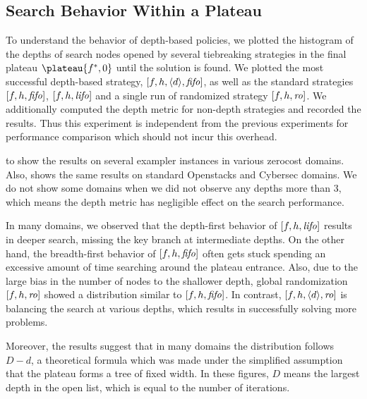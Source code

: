 \subsection{Search Behavior Within a Plateau}

To understand the behavior of depth-based policies, we plotted the
histogram of the depths of search nodes opened by several tiebreaking
strategies in the final plateau $\plateau{f^*,0}$ until the solution is
found.  We plotted the most successful depth-based strategy,
$[f,h,{\left<d\right>},{\text{\textit{fifo}}}]$, as well as the standard strategies $[f,h,{\text{\textit{fifo}}}]$,
$[f,h,{\text{\textit{lifo}}}]$ and a single run of randomized strategy $[f,h,{\text{\textit{ro}}}]$.
We additionally computed the depth metric for non-depth strategies and
recorded the results. Thus this experiment is independent from the
previous experiments for performance comparison which should not incur
this overhead.


 to 
 show the results on several exampler
instances in various zerocost domains. Also,
  shows the same results on standard
 Openstacks and Cybersec domains. We do not show some domains when we did
not observe any depths more than 3, which means the depth metric has
negligible effect on the search performance.

In many domains, we observed that the depth-first behavior of
$[f,h,{\text{\textit{lifo}}}]$ results in deeper search, missing the key branch at
intermediate depths.  On the other hand, the breadth-first behavior of
$[f,h,{\text{\textit{fifo}}}]$ often gets stuck spending an excessive amount of time
searching around the plateau entrance.  Also, due to the large bias in
the number of nodes to the shallower depth, global randomization
$[f,h,{\text{\textit{ro}}}]$ showed a distribution similar to $[f,h,{\text{\textit{fifo}}}]$.
In contrast, $[f,h,{\left<d\right>},{\text{\textit{ro}}}]$ is balancing the search at various depths, which
results in successfully solving more problems.

Moreover, the results suggest that in many domains the distribution follows
$D-d$, a theoretical formula which was made under the simplified
assumption that the plateau forms a tree of fixed width. In these
figures, $D$ means the largest depth in the open list, which is equal to
the number of iterations.


